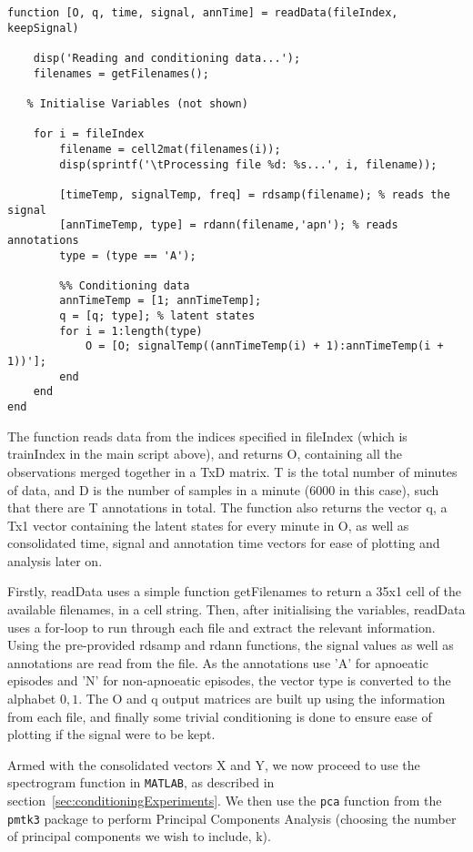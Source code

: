 \begin{lstlisting}
function [O, q, time, signal, annTime] = readData(fileIndex, keepSignal)

    disp('Reading and conditioning data...');
    filenames = getFilenames();

   % Initialise Variables (not shown)

    for i = fileIndex
        filename = cell2mat(filenames(i));
        disp(sprintf('\tProcessing file %d: %s...', i, filename));
        
        [timeTemp, signalTemp, freq] = rdsamp(filename); % reads the signal
        [annTimeTemp, type] = rdann(filename,'apn'); % reads annotations
        type = (type == 'A');

        %% Conditioning data
        annTimeTemp = [1; annTimeTemp];
        q = [q; type]; % latent states
        for i = 1:length(type)
            O = [O; signalTemp((annTimeTemp(i) + 1):annTimeTemp(i + 1))'];
        end
    end
end
\end{lstlisting}

The function reads data from the indices specified in fileIndex (which is trainIndex in the main script above), and returns O, containing all the observations merged together in a TxD matrix. T is the total number of minutes of data, and D is the number of samples in a minute (6000 in this case), such that there are T annotations in total. The function also returns the vector q, a Tx1 vector containing the latent states for every minute in O, as well as consolidated time, signal and annotation time vectors for ease of plotting and analysis later on.

Firstly, readData uses a simple function getFilenames to return a 35x1 cell of the available filenames, in a cell string. Then, after initialising the variables, readData uses a for-loop to run through each file and extract the relevant information. Using the pre-provided rdsamp and rdann functions, the signal values as well as annotations are read from the file. As the annotations use 'A' for apnoeatic episodes and 'N' for non-apnoeatic episodes, the vector type is converted to the alphabet ${0,1}$. The O and q output matrices are built up using the information from each file, and finally some trivial conditioning is done to ensure ease of plotting if the signal were to be kept.

Armed with the consolidated vectors X and Y, we now proceed to use the spectrogram function in \verb!MATLAB!\textsuperscript{\textregistered}, as described in section~\ref{sec:conditioningExperiments}. We then use the \verb!pca! function from the \verb!pmtk3! package to perform Principal Components Analysis (choosing the number of principal components we wish to include, k). 